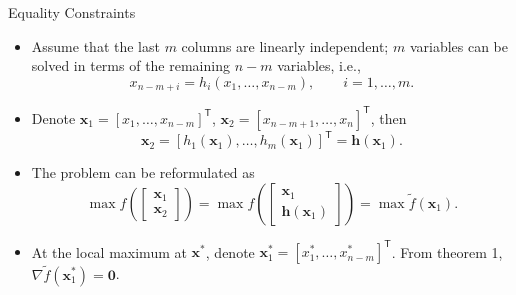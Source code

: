 \documentclass[aspectratio=169,hyperref,UTF8,CJK]{beamer}
\newcommand{\trans}{\mathsf{T}}
\newcommand{\vect}[1]{\boldsymbol{#1}}
\begin{document}
\begin{frame}{Equality Constraints}
  \small
  \begin{itemize}
    \item Assume that the last $m$ columns are linearly independent; $m$ variables can be solved in terms of the remaining $n-m$ variables, i.e.,
      \begin{equation*}
        x_{n-m+i}=h_i(x_1,\ldots,x_{n-m}),\qquad i=1,\ldots,m.
      \end{equation*}
    \item Denote $\vect{x}_1=[x_1,\ldots,x_{n-m}]^{\trans}$, $\vect{x}_2=[x_{n-m+1},\ldots,x_n]^{\trans}$, then
      \begin{equation*}
        \vect{x}_2=[h_1(\vect{x}_1),\ldots,h_m(\vect{x}_1)]^{\trans}=\vect{h}(\vect{x}_1).
      \end{equation*}
    \item The problem can be reformulated as
      \begin{equation*}
        \max f\left(\begin{bmatrix}\vect{x}_1\\\vect{x}_2\end{bmatrix}\right)
        =\max f\left(\begin{bmatrix}\vect{x}_1\\\vect{h}(\vect{x}_1)\end{bmatrix}\right)
        =\max\widetilde f(\vect{x}_1).
      \end{equation*}
    \item At the local maximum at $\vect{x}^{*}$, denote
      $\vect{x}_1^{*}=[x_1^{*},\ldots,x_{n-m}^{*}]^{\trans}$. From theorem 1,
      $\nabla\widetilde f(\vect{x}_1^{*})=\vect{0}$.
  \end{itemize}
\end{frame}
\end{document}
